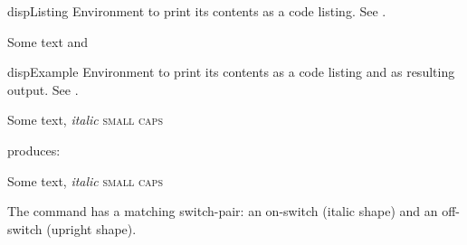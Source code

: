 \documentclass{article}
\newenvironment{testlist}
               {\list{}{\leftmargin2cm\rightmargin\leftmargin}%
                \item\relax\footnotesize}
               {\endlist}
\begin{document}

\begin{docEnvironment}[
doc no index, %
doc description=meta,
] {dispListing}%
{}%
Environment to print its contents as a code listing. See .
\begin{dispExample}
  \begin{dispListing}
  Some text and 
  \end{dispListing}
\end{dispExample}
\end{docEnvironment}




\begin{docEnvironment}[
doc no index, %
doc description=meta,
] {dispExample}%
{}%
Environment to print its contents as a code listing and as resulting output. See .
\begin{dispListing}
\begin{dispExample}
  Some text, \textit{italic} \textsc{small caps}
\end{dispExample}
\end{dispListing}
produces:  
  \begin{dispExample}
  Some text, \textit{italic} \textsc{small caps}
	\end{dispExample}
\end{docEnvironment}







The \lilcode{\textit{}} command has a matching switch-pair: an on-switch \lilcode{\itshape} (italic shape) and an off-switch \lilcode{\upshape} (upright shape).


%
\end{document}
